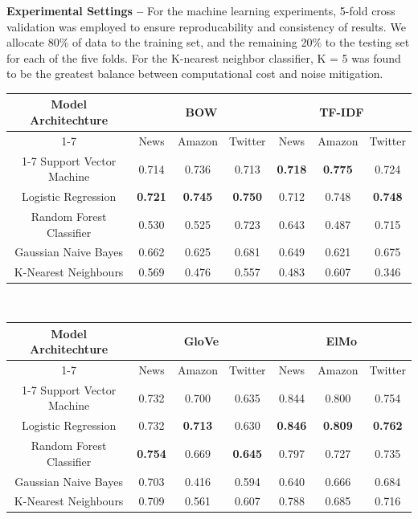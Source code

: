 \documentclass[12pt,a4paper]{article}
\begin{document}
\noindent \textbf{Experimental Settings --} For the machine learning experiments, 5-fold cross validation was employed to ensure reproducability and consistency of results. We allocate 80\% of data to the training set, and the remaining 20\% to the testing set for each of the five folds. For the K-nearest neighbor classifier, K = 5 was found to be the greatest balance between computational cost and noise mitigation.\\

\begin{tabular}{|c||c|c|c||c|c|c|}
	\hline
	\multirow{3}{*}{\textbf{Model Architechture}} & \multicolumn{3}{c||}{\textbf{BOW}} & \multicolumn{3}{c|}{\textbf{TF-IDF}}\\
	\cline{1-7}
	& News & Amazon & Twitter & News & Amazon & Twitter\\
	\cline{1-7}
	Support Vector Machine & 0.714 & 0.736 & 0.713 &\textbf{0.718} &\textbf{0.775} & 0.724\\
	Logistic Regression & \textbf{0.721}& \textbf{0.745}& \textbf{0.750}&0.712 &0.748 & \textbf{0.748}\\
	Random Forest Classifier &0.530 &0.525 & 0.723 &0.643 & 0.487 & 0.715\\
	Gaussian Naive Bayes & 0.662& 0.625& 0.681 &0.649 &0.621 & 0.675\\
	K-Nearest Neighbours & 0.569& 0.476& 0.557 & 0.483& 0.607 & 0.346\\
	\hline
\end{tabular}\\

\begin{tabular}{|c||c|c|c||c|c|c|}
	\hline
	\multirow{3}{*}{\textbf{Model Architechture}} & \multicolumn{3}{|c||}{\textbf{GloVe}} & \multicolumn{3}{c|}{\textbf{ElMo}}\\
	\cline{1-7}
	& News & Amazon & Twitter & News & Amazon & Twitter\\
	\cline{1-7}
	Support Vector Machine & 0.732 &0.700 & 0.635 & 0.844 & 0.800& 0.754\\
	Logistic Regression & 0.732 &\textbf{0.713} & 0.630 &\textbf{0.846} & \textbf{0.809} & \textbf{0.762}\\
	Random Forest Classifier & \textbf{0.754}&0.669 &\textbf{0.645} &0.797 &0.727 & 0.735\\
	Gaussian Naive Bayes &0.703 & 0.416& 0.594 &0.640 &0.666 & 0.684\\
	K-Nearest Neighbours & 0.709& 0.561 & 0.607& 0.788& 0.685 & 0.716\\
	\hline
\end{tabular}\\
\vspace{100pt}
\end{document}
